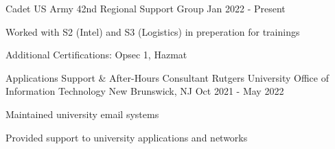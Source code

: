 

\begin{cventries}

  \cventry
    {Cadet} %
    {US Army} %
    {42nd Regional Support Group} %
    {Jan 2022 - Present} %
    {
      \begin{cvitems} %
        \item {Worked with S2 (Intel) and S3 (Logistics) in preperation for trainings}
        \item {Additional Certifications: Opsec 1,  Hazmat}
      \end{cvitems}
    }

  \cventry
    {Applications Support \& After-Hours Consultant} %
    {Rutgers University Office of Information Technology} %
    {New Brunswick,  NJ} %
    {Oct 2021 - May 2022} %
    {
      \begin{cvitems} %
        \item {Maintained university email systems}
        \item {Provided support to university applications and networks}
      \end{cvitems}
    }

\end{cventries}
